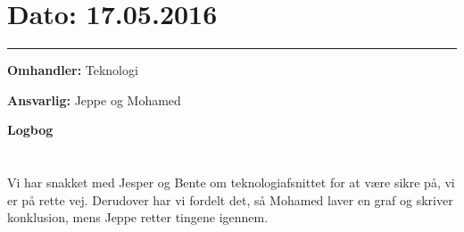 
\section{Dato: 17.05.2016}
\hrule

\textbf{Omhandler:} Teknologi

\textbf{Ansvarlig:} Jeppe og Mohamed

\textbf{Logbog}
\\
\\ \\
Vi har snakket med Jesper og Bente om teknologiafsnittet for at være sikre på, vi er på rette vej. Derudover har vi fordelt det, så Mohamed laver en graf og skriver konklusion, mens Jeppe retter tingene igennem.


